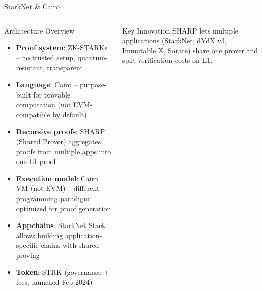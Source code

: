\documentclass[8pt,aspectratio=169]{beamer}
\begin{document}
\begin{frame}{StarkNet \& Cairo}
\vspace{-1mm}
\begin{columns}[T]
\begin{block}{Architecture Overview}
\footnotesize
\begin{itemize}\setlength\itemsep{3pt}
  \item \textbf{Proof system}: ZK-STARKs -- no trusted setup, quantum-resistant, transparent
  \item \textbf{Language}: Cairo -- purpose-built for provable computation (not EVM-compatible by default)
  \item \textbf{Recursive proofs}: SHARP (Shared Prover) aggregates proofs from multiple apps into one L1 proof
  \item \textbf{Execution model}: Cairo VM (not EVM) -- different programming paradigm optimized for proof generation
  \item \textbf{Appchains}: StarkNet Stack allows building application-specific chains with shared proving
  \item \textbf{Token}: STRK (governance + fees, launched Feb 2024)
\end{itemize}
\end{block}
\vspace{1mm}
\begin{alertblock}{Key Innovation}
\footnotesize
SHARP lets multiple applications (StarkNet, dYdX v3, Immutable X, Sorare) share one prover and split verification costs on L1.
\end{alertblock}
\vspace{2mm}
\end{columns}
\end{frame}
\end{document}
